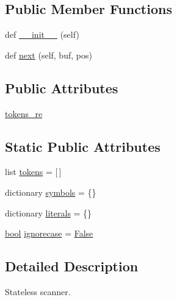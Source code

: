 \subsection*{Public Member Functions}
\begin{DoxyCompactItemize}
\item 
def \hyperlink{classsmacc__viewer_1_1xdot_1_1xdot__qt_1_1Scanner_af5e0b21d0aec01b80f81685d8d8eea5d}{\+\_\+\+\_\+init\+\_\+\+\_\+} (self)
\item 
def \hyperlink{classsmacc__viewer_1_1xdot_1_1xdot__qt_1_1Scanner_a14e9dd2f8307b567559ca699ee20019d}{next} (self, buf, pos)
\end{DoxyCompactItemize}
\subsection*{Public Attributes}
\begin{DoxyCompactItemize}
\item 
\hyperlink{classsmacc__viewer_1_1xdot_1_1xdot__qt_1_1Scanner_a8675d493894ea6645ceeff68548d45bc}{tokens\+\_\+re}
\end{DoxyCompactItemize}
\subsection*{Static Public Attributes}
\begin{DoxyCompactItemize}
\item 
list \hyperlink{classsmacc__viewer_1_1xdot_1_1xdot__qt_1_1Scanner_a8d7577fe009632274aaded49a04e2dfc}{tokens} = \mbox{[}$\,$\mbox{]}
\item 
dictionary \hyperlink{classsmacc__viewer_1_1xdot_1_1xdot__qt_1_1Scanner_a3910ada5bcaac1222b8dd542fed35490}{symbols} = \{\}
\item 
dictionary \hyperlink{classsmacc__viewer_1_1xdot_1_1xdot__qt_1_1Scanner_a22a0159a6481045c7a87bab63a516d46}{literals} = \{\}
\item 
\hyperlink{classbool}{bool} \hyperlink{classsmacc__viewer_1_1xdot_1_1xdot__qt_1_1Scanner_a773ef016960c16575fa2eb595617ec8b}{ignorecase} = \hyperlink{namespacesmacc__viewer_a5928e8da279785cbab9011356c3eaa87}{False}
\end{DoxyCompactItemize}


\subsection{Detailed Description}
\begin{DoxyVerb}Stateless scanner.\end{DoxyVerb}
 

